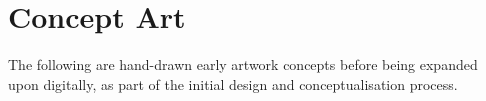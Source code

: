 \chapter{Concept Art}
\label{Concept Art}

The following are hand-drawn early artwork concepts before being expanded upon digitally, as part of the initial design and conceptualisation process.



